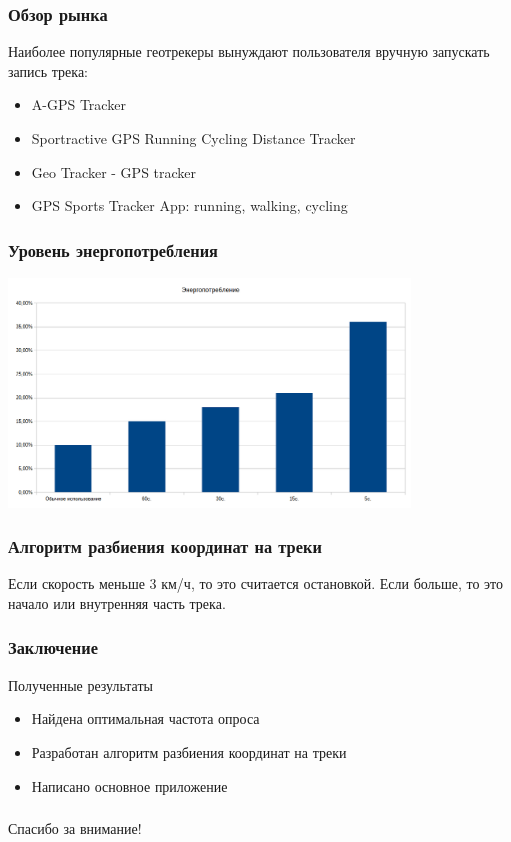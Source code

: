 \documentclass[hyperref={unicode}]{beamer}
\begin{document}
\begin{frame}
\frametitle{Обзор рынка}
Наиболее популярные геотрекеры вынуждают пользователя вручную запускать запись трека:
\begin{itemize}
	\item A-GPS Tracker
	\item Sportractive GPS Running Cycling Distance Tracker
	\item Geo Tracker - GPS tracker
	\item GPS Sports Tracker App: running, walking, cycling
\end{itemize}

\end{frame}
\begin{frame}
  \frametitle{Уровень энергопотребления}
	\begin{center}
		\includegraphics[width=0.8\textwidth]{images/Consuming.png}
	\end{center}
  
\end{frame}

\begin{frame}
\frametitle{Алгоритм разбиения координат на треки}
	Если скорость меньше 3 км/ч, то это считается остановкой. Если больше, то
	это начало или внутренняя часть трека.
\end{frame}


\begin{frame}
  \frametitle{Заключение}
  
  Полученные результаты
  
  \begin{itemize}
  	\item Найдена оптимальная частота опроса
  	\item Разработан алгоритм разбиения координат на треки
  	\item Написано основное приложение
  \end{itemize}
  
\end{frame}

\begin{frame}
  \frametitle{}
  
{\Large\mbox{}\hfil Спасибо за внимание!}
  
\end{frame}
\end{document}
